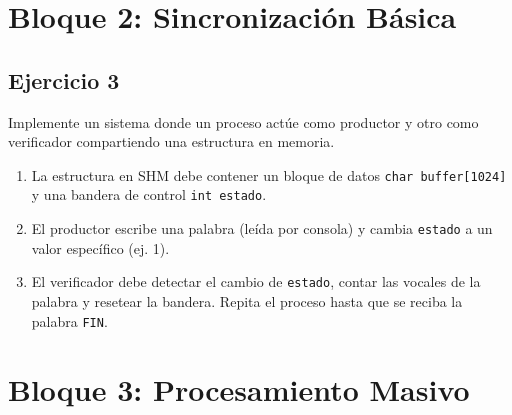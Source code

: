 \documentclass[12pt,a4paper]{article}
\begin{document}
\newpage

\section*{Bloque 2: Sincronización Básica}

\subsection*{Ejercicio 3}
Implemente un sistema donde un proceso actúe como productor y otro como verificador compartiendo una estructura en memoria.
\begin{enumerate}
    \item La estructura en SHM debe contener un bloque de datos \texttt{char buffer[1024]} y una bandera de control \texttt{int estado}.
    \item El productor escribe una palabra (leída por consola) y cambia \texttt{estado} a un valor específico (ej. 1).
    \item El verificador debe detectar el cambio de \texttt{estado}, contar las vocales de la palabra y resetear la bandera. Repita el proceso hasta que se reciba la palabra \texttt{FIN}.
\end{enumerate}

\begin{center}
\end{center}

\newpage

\section*{Bloque 3: Procesamiento Masivo}
\end{document}
